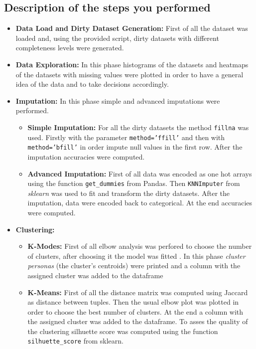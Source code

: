 \documentclass{article}
\begin{document}
\subsection{Description of the steps you performed}
\begin{itemize}
	\item\textbf{Data Load and Dirty Dataset Generation:} First of all the dataset was loaded and, using the provided script, dirty datasets with different completeness levels were generated.
	\item\textbf{Data Exploration:} In this phase histograms of the datasets and heatmaps of the datasets with missing values were plotted in order to have a general idea of the data and to take decisions accordingly.
	\item\textbf{Imputation:} In this phase simple and advanced imputations were performed.
		\begin{itemize}
			\item\textbf{Simple Imputation:} For all the dirty datasets the method \texttt{fillna} was used. Firstly with the parameter \texttt{method='ffill'} and then with \texttt{method='bfill'} in order impute null values in the first row. After the imputation accuracies were computed.
			\item\textbf{Advanced Imputation:} First of all data was encoded as one hot arrays using the function \texttt{get\_dummies} from Pandas. Then \texttt{KNNImputer} from \emph{sklearn} was used to fit and transform the dirty datasets. After the imputation, data were encoded back to categorical. At the end accuracies were computed.

		\end{itemize}
	\item\textbf{Clustering:}
		\begin{itemize}
			\item\textbf{K-Modes:} First of all elbow analysis was perfored to choose the number of clusters, after choosing it the model was fitted . In this phase \emph{cluster personas} (the cluster's centroids) were printed and a column with the assigned cluster was added to the dataframe
			\item\textbf{K-Means:} First of all the distance matrix was computed using Jaccard as distance between tuples. Then the usual elbow plot was plotted in order to choose the best number of clusters. At the end a column with the assigned cluster was added to the dataframe.  To asses the quality of the clustering silhuette score was computed using the function \texttt{silhuette\_score} from sklearn.
		\end{itemize}
\end{itemize}
\newpage
\end{document}
